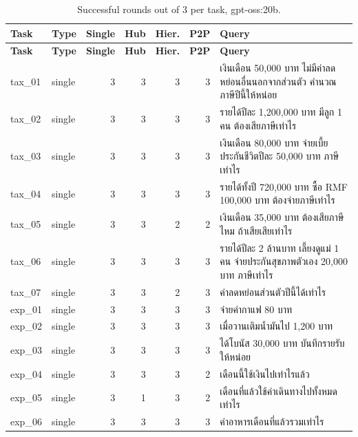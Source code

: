 \documentclass[11pt,a4paper]{article}
\begin{document}
{\scriptsize
\begin{longtable}{llrrrrp{7.2cm}}
\caption{Successful rounds out of 3 per task, gpt-oss:20b.}\label{tab:app-a-oss}\\
\toprule
\textbf{Task} & \textbf{Type} & \textbf{Single} & \textbf{Hub} & \textbf{Hier.} & \textbf{P2P} & \textbf{Query} \\
\midrule
\endfirsthead
\toprule
\textbf{Task} & \textbf{Type} & \textbf{Single} & \textbf{Hub} & \textbf{Hier.} & \textbf{P2P} & \textbf{Query} \\
\midrule
\endhead
\bottomrule
\endfoot
tax\_\allowbreak{}01 & single & 3 & 3 & 3 & 3 & {\thaifont เงินเดือน }50,000 {\thaifont บาท ไม่มีค่าลดหย่อนอื่นนอกจากส่วนตัว คำนวณภาษีปีนี้ให้หน่อย} \\
tax\_\allowbreak{}02 & single & 3 & 3 & 3 & 3 & {\thaifont รายได้ปีละ }1,200,000 {\thaifont บาท มีลูก }1 {\thaifont คน ต้องเสียภาษีเท่าไร} \\
tax\_\allowbreak{}03 & single & 3 & 3 & 3 & 3 & {\thaifont เงินเดือน }80,000 {\thaifont บาท จ่ายเบี้ยประกันชีวิตปีละ }50,000 {\thaifont บาท ภาษีเท่าไร} \\
tax\_\allowbreak{}04 & single & 3 & 3 & 3 & 3 & {\thaifont รายได้ทั้งปี }720,000 {\thaifont บาท ซื้อ }RMF 100,000 {\thaifont บาท ต้องจ่ายภาษีเท่าไร} \\
tax\_\allowbreak{}05 & single & 3 & 3 & 2 & 2 & {\thaifont เงินเดือน }35,000 {\thaifont บาท ต้องเสียภาษีไหม ถ้าเสียเสียเท่าไร} \\
tax\_\allowbreak{}06 & single & 3 & 3 & 3 & 3 & {\thaifont รายได้ปีละ }2 {\thaifont ล้านบาท เลี้ยงดูแม่ }1 {\thaifont คน จ่ายประกันสุขภาพตัวเอง }20,000 {\thaifont บาท ภาษีเท่าไร} \\
tax\_\allowbreak{}07 & single & 3 & 3 & 2 & 3 & {\thaifont ค่าลดหย่อนส่วนตัวปีนี้ได้เท่าไร} \\
exp\_\allowbreak{}01 & single & 3 & 3 & 3 & 3 & {\thaifont จ่ายค่ากาแฟ }80 {\thaifont บาท} \\
exp\_\allowbreak{}02 & single & 3 & 3 & 3 & 3 & {\thaifont เมื่อวานเติมน้ำมันไป }1,200 {\thaifont บาท} \\
exp\_\allowbreak{}03 & single & 3 & 3 & 3 & 3 & {\thaifont ได้โบนัส }30,000 {\thaifont บาท บันทึกรายรับให้หน่อย} \\
exp\_\allowbreak{}04 & single & 3 & 3 & 3 & 2 & {\thaifont เดือนนี้ใช้เงินไปเท่าไรแล้ว} \\
exp\_\allowbreak{}05 & single & 3 & 1 & 3 & 2 & {\thaifont เดือนที่แล้วใช้ค่าเดินทางไปทั้งหมดเท่าไร} \\
exp\_\allowbreak{}06 & single & 3 & 3 & 3 & 3 & {\thaifont ค่าอาหารเดือนที่แล้วรวมเท่าไร} \\

\end{longtable}}
\end{document}
